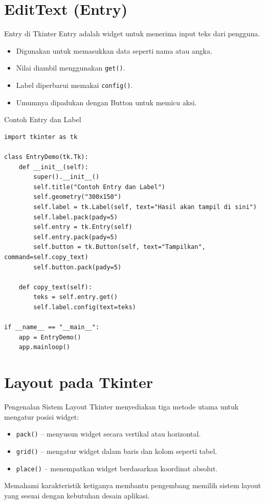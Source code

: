 \documentclass[aspectratio=169, table]{beamer}
\begin{document}
\section{EditText (Entry)}
\begin{frame}[fragile]{Entry di Tkinter}
\vspace{20pt}
Entry adalah widget untuk menerima input teks dari pengguna.

\begin{itemize}
    \item Digunakan untuk memasukkan data seperti nama atau angka.
    \item Nilai diambil menggunakan \texttt{get()}.
    \item Label diperbarui memakai \texttt{config()}.
    \item Umumnya dipadukan dengan Button untuk memicu aksi.
\end{itemize}
\end{frame}

\begin{frame}[fragile]{Contoh Entry dan Label}
\vspace{20pt}
\begin{lstlisting}[style=PythonStyle, basicstyle=\ttfamily\scriptsize]
import tkinter as tk

class EntryDemo(tk.Tk):
    def __init__(self):
        super().__init__()
        self.title("Contoh Entry dan Label")
        self.geometry("300x150")
        self.label = tk.Label(self, text="Hasil akan tampil di sini")
        self.label.pack(pady=5)
        self.entry = tk.Entry(self)
        self.entry.pack(pady=5)
        self.button = tk.Button(self, text="Tampilkan", command=self.copy_text)
        self.button.pack(pady=5)

    def copy_text(self):
        teks = self.entry.get()
        self.label.config(text=teks)

if __name__ == "__main__":
    app = EntryDemo()
    app.mainloop()
\end{lstlisting}
\end{frame}

\section{Layout pada Tkinter}
\begin{frame}[fragile]{Pengenalan Sistem Layout}
\vspace{20pt}
Tkinter menyediakan tiga metode utama untuk mengatur posisi widget:

\begin{itemize}
    \item \texttt{pack()} – menyusun widget secara vertikal atau horizontal.
    \item \texttt{grid()} – mengatur widget dalam baris dan kolom seperti tabel.
    \item \texttt{place()} – menempatkan widget berdasarkan koordinat absolut.
\end{itemize}

Memahami karakteristik ketiganya membantu pengembang memilih sistem layout yang sesuai dengan kebutuhan desain aplikasi.
\end{frame}
\end{document}
